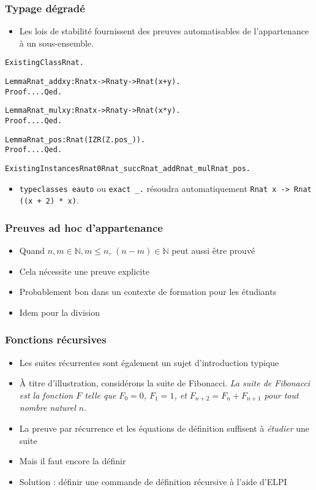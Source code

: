 \documentclass[compress]{beamer}
\begin{document}
\begin{frame}[fragile]
\frametitle{Typage d\'egrad\'e}
\begin{itemize}
\item Les lois de stabilit\'e fournissent des preuves automatisables de l'appartenance \`a un sous-ensemble.
\end{itemize}
\begin{small}
\begin{alltt}
Existing Class Rnat.

Lemma Rnat_add x y : Rnat x -> Rnat y -> Rnat (x + y).
Proof. ... Qed.

Lemma Rnat_mul x y : Rnat x -> Rnat y -> Rnat (x * y).
Proof. ... Qed.

Lemma Rnat_pos : Rnat (IZR (Z.pos _)).
Proof. ... Qed.

Existing Instances Rnat0 Rnat_succ Rnat_add Rnat_mul Rnat_pos.
\end{alltt}
\end{small}
\begin{itemize}
\item {\tt typeclasses eauto} ou {\tt exact \_.} r\'esoudra automatiquement
   {\tt Rnat x -> Rnat ((x + 2) * x)}.
\end{itemize}
\end{frame}
\begin{frame}
\frametitle{Preuves ad hoc d'appartenance}
\begin{itemize}
\item Quand \(n, m \in {\mathbb N}, m \leq n\), \((n - m) \in {\mathbb N}\) peut aussi \^etre prouv\'e
\item Cela n\'ecessite une preuve explicite
\item Probablement bon dans un contexte de formation pour les \'etudiants
\item Idem pour la division
\end{itemize}
\end{frame}
\begin{frame}
\frametitle{Fonctions r\'ecursives}
\begin{itemize}
\item Les suites r\'ecurrentes sont \'egalement un sujet d'introduction typique
\item \`A titre d'illustration, consid\'erons la suite de Fibonacci.
{\em La suite de Fibonacci est la fonction \(F\) telle que \(F_0= 0\), \(F_1=1\), et \(F_{n+2} = F_{n} + F_{n + 1}\) pour tout nombre naturel \(n\)}.
\item La preuve par r\'ecurrence et les \'equations de d\'efinition suffisent \`a
{\em \'etudier} une suite
\item Mais il faut encore la d\'efinir
\item Solution : d\'efinir une commande de d\'efinition r\'ecursive \`a l'aide d'ELPI
\end{itemize}
\end{frame}
\end{document}
